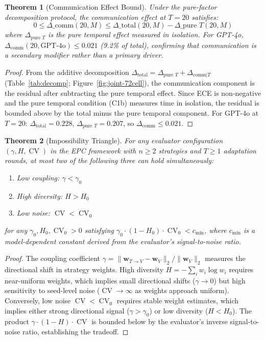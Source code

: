 \documentclass[11pt]{article}
\DeclareMathOperator{\CV}{CV}
\newtheorem{theorem}{Theorem}
\begin{document}
\begin{theorem}[Communication Effect Bound]
\label{thm:comm-bound}
Under the pure-factor decomposition protocol, the communication effect at $T{=}20$ satisfies:
\begin{equation}
    0 \leq \Delta\_{\text{comm}}(20, M) \leq \Delta\_{\text{total}}(20, M) - \Delta\_{\text{pure } T}(20, M)
\end{equation}
where $\Delta_{\text{pure } T}$ is the pure temporal effect measured in isolation. For GPT-4o, $\Delta_{\text{comm}}(20, \text{GPT-4o}) \leq 0.021$ (9.2\% of total), confirming that communication is a secondary modifier rather than a primary driver.
\end{theorem}

\begin{proof}
From the additive decomposition $\Delta_{\text{total}} = \Delta_{\text{pure } T} + \Delta_{\text{comm}|T}$ (Table~\ref{tab:decomp}; Figure~\ref{fig:joint-72cell}), the communication component is the residual after subtracting the pure temporal effect. Since ECE is non-negative and the pure temporal condition (C1b) measures time in isolation, the residual is bounded above by the total minus the pure temporal component. For GPT-4o at $T{=}20$: $\Delta_{\text{total}}{=}0.228$, $\Delta_{\text{pure } T}{=}0.207$, so $\Delta_{\text{comm}} \leq 0.021$.
\end{proof}

\begin{theorem}[Impossibility Triangle]
\label{thm:triangle}
For any evaluator configuration $(\gamma, H, \CV)$ in the EPC framework with $n \geq 2$ strategies and $T \geq 1$ adaptation rounds, at most two of the following three can hold simultaneously:
\begin{enumerate}[leftmargin=*,nosep]
    \item Low coupling: $\gamma < \gamma_0$
    \item High diversity: $H > H_0$
    \item Low noise: $\CV < \CV_0$
\end{enumerate}
for any $\gamma_0, H_0, \CV_0 > 0$ satisfying $\gamma_0 \cdot (1 - H_0) \cdot \CV_0 < c_{\min}$, where $c_{\min}$ is a model-dependent constant derived from the evaluator's signal-to-noise ratio.
\end{theorem}

\begin{proof}
The coupling coefficient $\gamma = \|\mathbf{w}_{T\to V} - \mathbf{w}_V\|_2 / \|\mathbf{w}_V\|_2$ measures the directional shift in strategy weights. High diversity $H = -\sum_i w_i \log w_i$ requires near-uniform weights, which implies small directional shifts ($\gamma \to 0$) but high sensitivity to seed-level noise ($\CV \to \infty$ as weights approach uniform). Conversely, low noise $\CV < \CV_0$ requires stable weight estimates, which implies either strong directional signal ($\gamma > \gamma_0$) or low diversity ($H < H_0$). The product $\gamma \cdot (1-H) \cdot \CV$ is bounded below by the evaluator's inverse signal-to-noise ratio, establishing the tradeoff.
\end{proof}
\end{document}
